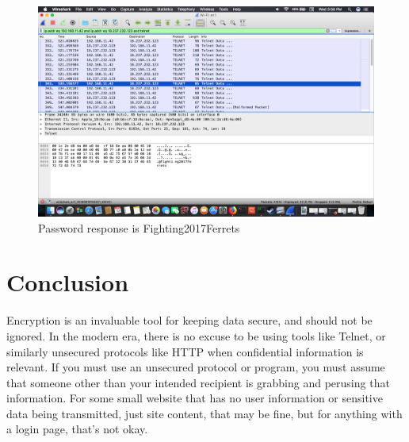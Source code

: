 \documentclass{article}
\begin{document}
\begin{figure}[h]
	\includegraphics[width=\linewidth]{telnet3.png}
	\caption{Password response is Fighting2017Ferrets}
	\label{fig:telnet3}
\end{figure}

\section{Conclusion}

Encryption is an invaluable tool for keeping data secure, and should not be
ignored. In the modern era, there is no excuse to be using tools like Telnet,
or similarly unsecured protocols like HTTP when confidential information is
relevant. If you must use an unsecured protocol or program, you must assume
that someone other than your intended recipient is grabbing and perusing that
information. For some small website that has no user information or sensitive
data being transmitted, just site content, that may be fine, but for anything
with a login page, that's not okay.
\end{document}
